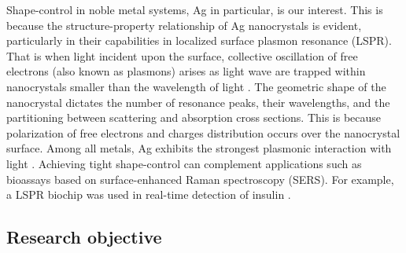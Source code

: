 Shape-control in noble metal systems, Ag in particular, is our interest.
This is because the structure-property relationship of Ag nanocrystals is evident, particularly in their capabilities in localized surface plasmon resonance (LSPR).
That is when light incident upon the surface, collective oscillation of free electrons (also known as plasmons) arises as light wave are trapped within nanocrystals smaller than the wavelength of light \cite{Petryayeva_2011}.
The geometric shape of the nanocrystal dictates the number of resonance peaks, their wavelengths, and the partitioning between scattering and absorption cross sections.
This is because polarization of free electrons and charges distribution occurs over the nanocrystal surface.
Among all metals, Ag exhibits the strongest plasmonic interaction with light \cite{Lu_2009}.
Achieving tight shape-control can complement applications such as bioassays based on surface-enhanced Raman spectroscopy (SERS).
For example, a LSPR biochip was used in real-time detection of insulin \cite{Hiep_2008}.


\subsection{Research objective}


    
    